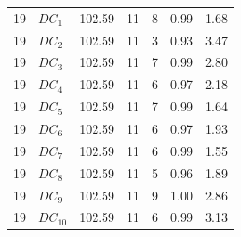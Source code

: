 \begin{longtable}{rlrrrrr}
19 & $DC_{1}$ & 102.59 & 11 & 8 & 0.99 & 1.68 \\
19 & $DC_{2}$ & 102.59 & 11 & 3 & 0.93 & 3.47 \\
19 & $DC_{3}$ & 102.59 & 11 & 7 & 0.99 & 2.80 \\
19 & $DC_{4}$ & 102.59 & 11 & 6 & 0.97 & 2.18 \\
19 & $DC_{5}$ & 102.59 & 11 & 7 & 0.99 & 1.64 \\
19 & $DC_{6}$ & 102.59 & 11 & 6 & 0.97 & 1.93 \\
19 & $DC_{7}$ & 102.59 & 11 & 6 & 0.99 & 1.55 \\
19 & $DC_{8}$ & 102.59 & 11 & 5 & 0.96 & 1.89 \\
19 & $DC_{9}$ & 102.59 & 11 & 9 & 1.00 & 2.86 \\
19 & $DC_{10}$ & 102.59 & 11 & 6 & 0.99 & 3.13 \\
\end{longtable}

